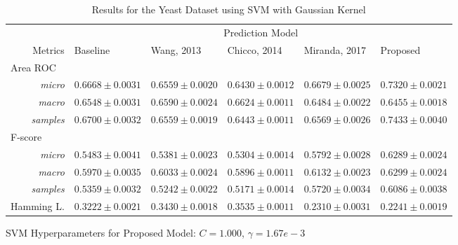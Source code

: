 \begin{table}[t]
    \footnotesize
    \centering
    \caption{Results for the Yeast Dataset using SVM with Gaussian Kernel}
    \label{results:yeast_svm_main}
    \begin{threeparttable}
    \begin{tabular}{@{}rrlllll@{}}
    \toprule
    && \multicolumn{5}{c}{Prediction Model} \\ \cmidrule{3-7}
    \multicolumn{2}{r}{Metrics}               & Baseline                & Wang, 2013 & Chicco, 2014 & Miranda, 2017 & Proposed            \\ \midrule
\multicolumn{2}{l}{Area ROC} \\
                    & \textit{micro}            & $0.6668 \pm 0.0031$ & $0.6559 \pm 0.0020$ & $0.6430 \pm 0.0012$ & $0.6679 \pm 0.0025$ & $\mathbf{0.7320 \pm 0.0021} $ \\
                     & \textit{macro}            & $0.6548 \pm 0.0031$ & $0.6590 \pm 0.0024$ & $\mathbf{0.6624 \pm 0.0011}$ & $0.6484 \pm 0.0022$ & $0.6455 \pm 0.0018 $ \\
                     & \textit{samples}            & $0.6700 \pm 0.0032$ & $0.6559 \pm 0.0019$ & $0.6443 \pm 0.0011$ & $0.6569 \pm 0.0026$ & $\mathbf{0.7433 \pm 0.0040} $ \\
\multicolumn{2}{l}{F-score} \\
                    & \textit{micro}            & $0.5483 \pm 0.0041$ & $0.5381 \pm 0.0023$ & $0.5304 \pm 0.0014$ & $0.5792 \pm 0.0028$ & $\mathbf{0.6289 \pm 0.0024} $ \\
                     & \textit{macro}            & $0.5970 \pm 0.0035$ & $0.6033 \pm 0.0024$ & $0.5896 \pm 0.0011$ & $0.6132 \pm 0.0023$ & $\mathbf{0.6299 \pm 0.0024} $ \\
                     & \textit{samples}            & $0.5359 \pm 0.0032$ & $0.5242 \pm 0.0022$ & $0.5171 \pm 0.0014$ & $0.5720 \pm 0.0034$ & $\mathbf{0.6086 \pm 0.0038} $ \\ 
\multicolumn{2}{l}{Hamming L.}            & $0.3222 \pm 0.0021$ & $0.3430 \pm 0.0018$ & $0.3535 \pm 0.0011$ & $0.2310 \pm 0.0031$ & $\mathbf{0.2241 \pm 0.0019}$ \\
\bottomrule
    \end{tabular}
    \begin{tablenotes}
        \item SVM Hyperparameters for Proposed Model: $C=1.000$, $\gamma=1.67e-3$
    \end{tablenotes}
    \end{threeparttable}
\end{table}
